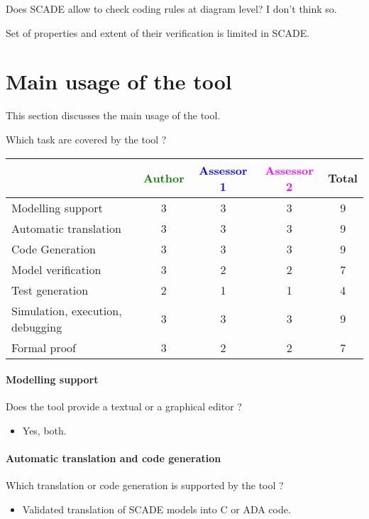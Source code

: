 \begin{assessor1}
  Does SCADE allow to check coding rules at diagram level? I don't
  think so.

  Set of properties and extent of their verification is limited in
  SCADE.
\end{assessor1}



\section{Main usage of the tool}
\label{main_usage}

This section discusses the main usage of the tool.

Which task are covered by the tool ?


\begin{tabular}{|l | c | c | c | c|}
\hline
& \textcolor{green}{Author} & \textcolor{blue}{Assessor 1} & \textcolor{magenta}{Assessor 2} & Total \\
\hline 
Modelling support & 3 & 3 &3 & 9 \\
\hline
Automatic translation  & 3 & 3 &3 & 9 \\
\hline
Code Generation  & 3 & 3 &3 & 9 \\
\hline
Model verification & 3 & 2 &2 & 7 \\
\hline
Test generation & 2 & 1 &1 & 4 \\
\hline
Simulation, execution, debugging & 3 & 3 &3 & 9 \\
\hline
Formal proof & 3 & 2 &2 & 7 \\
\hline
\end{tabular}

\paragraph{Modelling support}
Does the tool provide a  textual or a graphical editor ? 

\begin{itemize}
	\item Yes, both.
\end{itemize}


\paragraph{Automatic translation and code generation}
Which translation or code generation is supported by the tool ?

\begin{itemize}
	\item Validated translation of SCADE models into C or ADA code.
\end{itemize}

